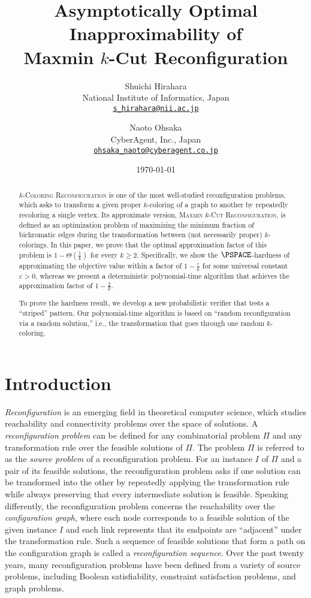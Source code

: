 \documentclass[11pt,fleqn]{article}
\title{Asymptotically Optimal Inapproximability of \\ Maxmin $k$-Cut Reconfiguration}
\author{
Shuichi Hirahara \\
\small{National Institute of Informatics, Japan} \\
\small{\href{mailto:s\_hirahara@nii.ac.jp}{\texttt{s\_hirahara@nii.ac.jp}}}
\and
Naoto Ohsaka \\
\small{CyberAgent, Inc., Japan} \\
\small{\href{mailto:naoto.ohsaka@gmail.com}{\texttt{ohsaka\_naoto@cyberagent.co.jp}}}
}
\date{\today}
\newcommand{\prb}[1]{\textsc{#1}\xspace}
\theoremstyle{definition}
\numberwithin{equation}{section}
\begin{document}
\maketitle
\thispagestyle{empty}

\begin{abstract}\prb{$k$-Coloring Reconfiguration} is one of the most well-studied reconfiguration problems, which asks to
transform a given proper $k$-coloring of a graph to another by repeatedly recoloring a single vertex.
Its approximate version, \prb{Maxmin $k$-Cut Reconfiguration},
is defined as an optimization problem of maximizing the minimum fraction of bichromatic edges during the transformation between (not necessarily proper) $k$-colorings.
In this paper,
we prove that the optimal approximation factor of this problem is $1 - \Theta\left(\frac{1}{k}\right)$ for every $k \ge 2$.
Specifically, we show the $\PSPACE$-hardness of approximating the objective value within a factor of $1 - \frac{\varepsilon}{k}$ for some universal constant $\varepsilon > 0$,
whereas we present a deterministic polynomial-time algorithm that achieves the approximation factor of $1 - \frac{2}{k}$.

To prove the hardness result, we develop a new probabilistic verifier that tests a ``striped'' pattern.
Our polynomial-time algorithm is based on ``random reconfiguration via a random solution,'' i.e., 
the transformation that goes through one random $k$-coloring.
 \end{abstract}


\clearpage
\tableofcontents

\clearpage
\section{Introduction}

\emph{Reconfiguration} is an emerging field in theoretical computer science,
which studies reachability and connectivity problems over the space of solutions.
A \emph{reconfiguration problem} can be defined
for any combinatorial problem $\Pi$ and any transformation rule over the feasible solutions of $\Pi$.
The problem $\Pi$ is referred to as the \emph{source problem} of a reconfiguration problem.
For an instance $I$ of $\Pi$ and a pair of its feasible solutions,
the reconfiguration problem asks if
one solution can be transformed into the other 
by repeatedly applying the transformation rule
while always preserving that every intermediate solution is feasible.
Speaking differently,
the reconfiguration problem concerns the reachability over the \emph{configuration graph}, where
each node corresponds to a feasible solution of the given instance $I$ and 
each link represents that its endpoints are ``adjacent'' under the transformation rule.
Such a sequence of feasible solutions that form a path on the configuration graph is called a \emph{reconfiguration sequence}.
Over the past twenty years,
many reconfiguration problems have been defined from a variety of source problems,
including Boolean satisfiability, constraint satisfaction problems, and graph problems.
\end{document}
